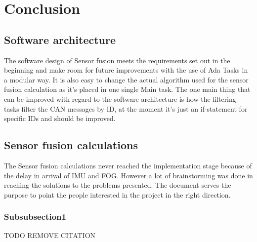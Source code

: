 \section{Conclusion}\label{sec:conclusion}
\subsection{Software architecture}
The software design of Sensor fusion meets the requirements set out in the
beginning and make room for future improvements with the use of Ada Tasks
in a modular way. It is also easy to change the actual algorithm used for the
sensor fusion calculation as it's placed in one single Main task. The one main
thing that can be improved with regard to the software architecture is how
the filtering tasks filter the CAN messages by ID, at the moment it's just an
if-statement for specific IDs and should be improved.

\subsection{Sensor fusion calculations}
The Sensor fusion calculations never reached the implementation stage because of the delay in arrival of IMU and FOG. However a lot of brainstorming was done in reaching the solutions to the problems presented. The document serves the purpose to point the people interested in the project in the right direction.

\subsubsection{Subsubsection1}
TODO REMOVE CITATION\cite{web:vagrant}
